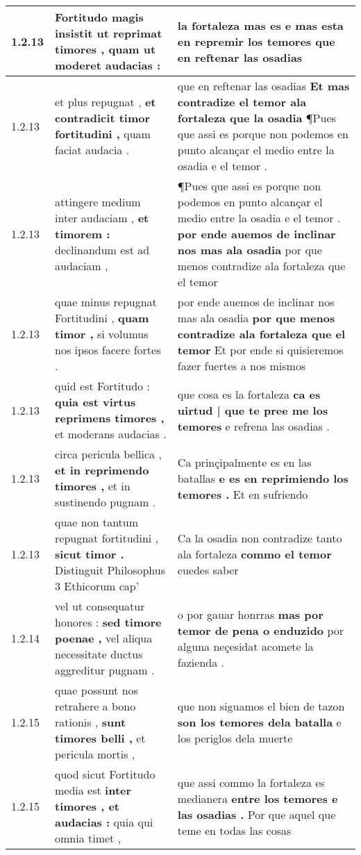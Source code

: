 \begin{tabular}{|p{1cm}|p{6.5cm}|p{6.5cm}|}
1.2.13 & Fortitudo magis insistit \textbf{ ut reprimat timores , } quam ut moderet audacias : & la fortaleza mas es \textbf{ e mas esta en repremir los temores } que en reftenar las osadias \\\hline
1.2.13 & et plus repugnat , \textbf{ et contradicit timor fortitudini , } quam faciat audacia . & que en reftenar las osadias \textbf{ Et mas contradize el temor ala fortaleza que la osadia } ¶Pues que assi es porque non podemos en punto alcançar el medio entre la osadia e el temor . \\\hline
1.2.13 & attingere medium inter audaciam , \textbf{ et timorem : } declinandum est ad audaciam , & ¶Pues que assi es porque non podemos en punto alcançar el medio entre la osadia e el temor . \textbf{ por ende auemos de inclinar nos mas ala osadia } por que menos contradize ala fortaleza que el temor \\\hline
1.2.13 & quae minus repugnat Fortitudini , \textbf{ quam timor , } si volumus nos ipsos facere fortes . & por ende auemos de inclinar nos mas ala osadia \textbf{ por que menos contradize ala fortaleza que el temor } Et por ende si quisieremos fazer fuertes a nos mismos \\\hline
1.2.13 & quid est Fortitudo : \textbf{ quia est virtus reprimens timores , } et moderans audacias . & que cosa es la fortaleza \textbf{ ca es uirtud | que te pree me los temores } e refrena las osadias . \\\hline
1.2.13 & circa pericula bellica , \textbf{ et in reprimendo timores , } et in sustinendo pugnam . & Ca prinçipalmente es en las batallas \textbf{ e es en reprimiendo los temores . } Et en sufriendo \\\hline
1.2.13 & quae non tantum repugnat fortitudini , \textbf{ sicut timor . } Distinguit Philosophus 3 Ethicorum cap’ & Ca la osadia non contradize tanto ala fortaleza \textbf{ commo el temor } euedes saber \\\hline
1.2.14 & vel ut consequatur honores : \textbf{ sed timore poenae , } vel aliqua necessitate ductus aggreditur pugnam . & o por gauar honrras \textbf{ mas por temor de pena o enduzido } por alguna neçesidat acomete la fazienda . \\\hline
1.2.15 & quae possunt nos retrahere a bono rationis , \textbf{ sunt timores belli , } et pericula mortis , & que non siguamos el bien de tazon \textbf{ son los temores dela batalla } e los periglos dela muerte \\\hline
1.2.15 & quod sicut Fortitudo media est \textbf{ inter timores , et audacias : } quia qui omnia timet , & que assi commo la fortaleza es medianera \textbf{ entre los temores e las osadias . } Por que aquel que teme en todas las cosas \\\hline

\end{tabular}
